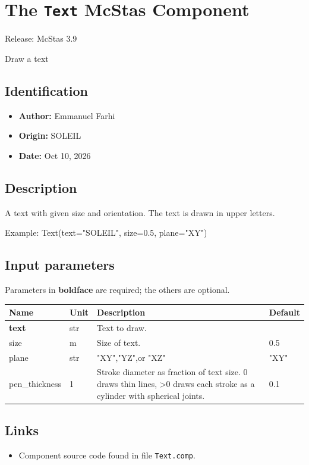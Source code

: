 \section{The \texttt{Text} McStas Component}
Release: McStas 3.9

Draw a text

\subsection*{Identification}
\begin{itemize}
  \item \textbf{Author:} Emmanuel Farhi
  \item \textbf{Origin:} SOLEIL
  \item \textbf{Date:} Oct 10, 2026
\end{itemize}

\subsection*{Description}
A text with given size and orientation. The text is drawn in upper letters.

Example: Text(text="SOLEIL", size=0.5, plane="XY")

\subsection*{Input parameters}
Parameters in \textbf{boldface} are required; the others are optional.

\begin{longtable}{p{}p{}p{}p{}}
\toprule
\textbf{Name} & \textbf{Unit} & \textbf{Description} & \textbf{Default} \\
\midrule
\endhead
\textbf{text} & str & Text to draw. &  \\
size & m & Size of text. & 0.5 \\
plane & str & "XY","YZ",or "XZ" & "XY" \\
pen\_thickness & 1 & Stroke diameter as fraction of text size. 0 draws thin lines, \textgreater{}0 draws each stroke as a cylinder with spherical joints. & 0.1 \\
\bottomrule
\end{longtable}

\subsection*{Links}
\begin{itemize}
  \item Component source code found in file \texttt{Text.comp}.
\end{itemize}
